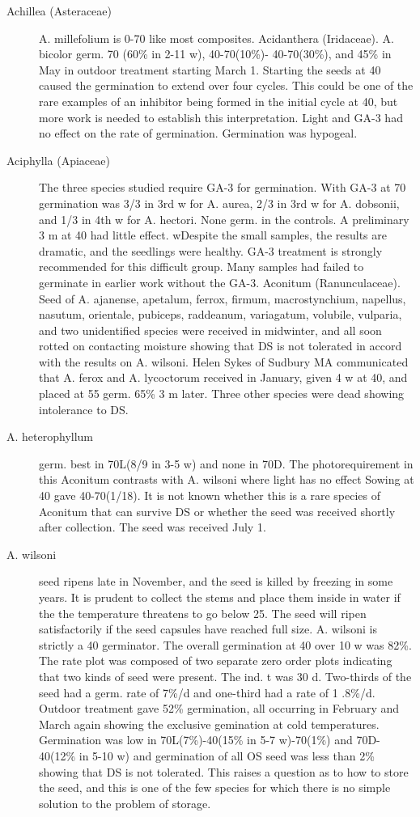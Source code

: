 \begin{description}
\item[Achillea (Asteraceae)] A. millefolium is 0-70 like most composites.
Acidanthera (Iridaceae). A. bicolor germ. 70 (60\% in 2-11 w), 40-70(10\%)-
40-70(30\%), and 45\% in May in outdoor treatment starting March 1. Starting the
seeds at 40 caused the germination to extend over four cycles. This could be one of
the rare examples of an inhibitor being formed in the initial cycle at 40, but more work
is needed to establish this interpretation. Light and GA-3 had no effect on the rate of
germination. Germination was hypogeal.

\item[Aciphylla (Apiaceae)] The three species studied require GA-3 for
germination. With GA-3 at 70 germination was 3/3 in 3rd w for A. aurea, 2/3 in 3rd w for
A. dobsonii, and 1/3 in 4th w for A. hectori. None germ. in the controls. A preliminary
3 m at 40 had little effect. wDespite the small samples, the results are dramatic, and the
seedlings were healthy. GA-3 treatment is strongly recommended for this difficult
group. Many samples had failed to germinate in earlier work without the GA-3.
Aconitum (Ranunculaceae). Seed of A. ajanense, apetalum, ferrox,
firmum, macrostynchium, napellus, nasutum, orientale, pubiceps, raddeanum,
variagatum, volubile, vulparia, and two unidentified species were received in
midwinter, and all soon rotted on contacting moisture showing that DS is not tolerated
in accord with the results on A. wilsoni. Helen Sykes of Sudbury MA communicated
that A. ferox and A. lycoctorum received in January, given 4 w at 40, and placed at 55
germ. 65\% 3 m later. Three other species were dead showing intolerance to DS.

\item[A. heterophyllum] germ. best in 70L(8/9 in 3-5 w) and none in 70D. The
photorequirement in this Aconitum contrasts with A. wilsoni where light has no effect
Sowing at 40 gave 40-70(1/18). It is not known whether this is a rare species of
Aconitum that can survive DS or whether the seed was received shortly after
collection. The seed was received July 1.

\item[A. wilsoni] seed ripens late in November, and the seed is killed by freezing in
some years. It is prudent to collect the stems and place them inside in water if the the
temperature threatens to go below 25. The seed will ripen satisfactorily if the seed
capsules have reached full size. A. wilsoni is strictly a 40 germinator. The overall
germination at 40 over 10 w was 82\%. The rate plot was composed of two separate
zero order plots indicating that two kinds of seed were present. The ind. t was 30 d.
Two-thirds of the seed had a germ. rate of 7\%/d and one-third had a rate of 1 .8\%/d.
Outdoor treatment gave 52\% germination, all occurring in February and March again
showing the exclusive gemination at cold temperatures. Germination was low in
70L(7\%)-40(15\% in 5-7 w)-70(1\%) and 70D-40(12\% in 5-10 w) and germination of all
OS seed was less than 2\% showing that DS is not tolerated. This raises a question as
to how to store the seed, and this is one of the few species for which there is no simple
solution to the problem of storage.


\end{description}

